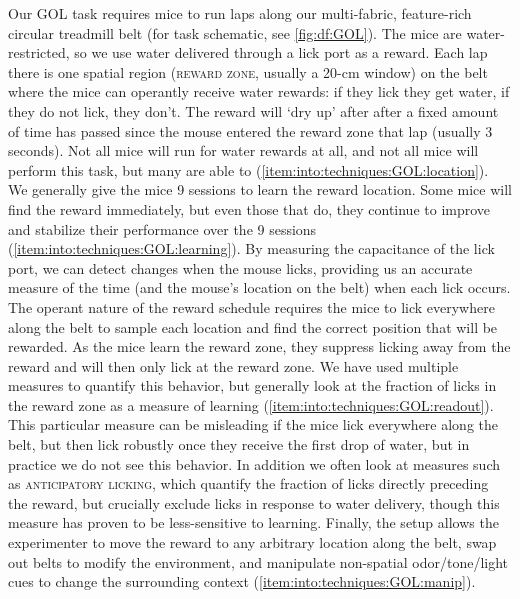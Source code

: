 Our \ac{GOL} task requires mice to run laps along our multi-fabric, feature-rich circular treadmill belt (for task schematic, see \autoref{fig:df:GOL}).
The mice are water-restricted, so we use water delivered through a lick port as a reward.
Each lap there is one spatial region (\textsc{reward zone}, usually a 20-cm window) on the belt where the mice can operantly receive water rewards: if they lick they get water, if they do not lick, they don't.
The reward will `dry up' after after a fixed amount of time has passed since the mouse entered the reward zone that lap (usually 3 seconds).
Not all mice will run for water rewards at all, and not all mice will perform this task, but many are able to (\ref{item:into:techniques:GOL:location}).
We generally give the mice 9 sessions to learn the reward location.
Some mice will find the reward immediately, but even those that do, they continue to improve and stabilize their performance over the 9 sessions (\ref{item:into:techniques:GOL:learning}).
By measuring the capacitance of the lick port, we can detect changes when the mouse licks, providing us an accurate measure of the time (and the mouse's location on the belt) when each lick occurs.
The operant nature of the reward schedule requires the mice to lick everywhere along the belt to sample each location and find the correct position that will be rewarded.
As the mice learn the reward zone, they suppress licking away from the reward and will then only lick at the reward zone.
We have used multiple measures to quantify this behavior, but generally look at the fraction of licks in the reward zone as a measure of learning (\ref{item:into:techniques:GOL:readout}).
This particular measure can be misleading if the mice lick everywhere along the belt, but then lick robustly once they receive the first drop of water, but in practice we do not see this behavior.
In addition we often look at measures such as \textsc{anticipatory licking}, which quantify the fraction of licks directly preceding the reward, but crucially exclude licks in response to water delivery, though this measure has proven to be less-sensitive to learning.
Finally, the setup allows the experimenter to move the reward to any arbitrary location along the belt, swap out belts to modify the environment, and manipulate non-spatial odor/tone/light cues to change the surrounding context (\ref{item:into:techniques:GOL:manip}).

